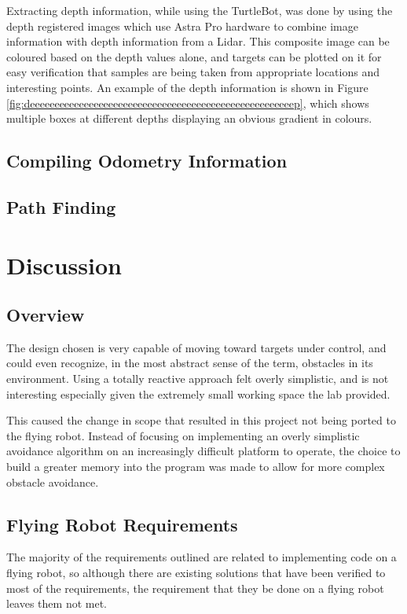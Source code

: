 \documentclass{article}[12]
\begin{document}
Extracting depth information, while using the TurtleBot, was done by using the depth registered images which use Astra Pro hardware to combine image information with depth information from a Lidar. This composite image can be coloured based on the depth values alone, and targets can be plotted on it for easy verification that samples are being taken from appropriate locations and interesting points. An example of the depth information is shown in Figure \ref{fig:deeeeeeeeeeeeeeeeeeeeeeeeeeeeeeeeeeeeeeeeeeeeeeeeeeeeeep}, which shows multiple boxes at different depths displaying an obvious gradient in colours.

\subsection{Compiling Odometry Information}

\subsection{Path Finding}


\section{Discussion}

\subsection{Overview}

	The design chosen is very capable of moving toward targets under control, and could even recognize, in the most abstract sense of the term, obstacles in its environment. Using a totally reactive approach felt overly simplistic, and is not interesting especially given the extremely small working space the lab provided.
	
	This caused the change in scope that resulted in this project not being ported to the flying robot. Instead of focusing on implementing an overly simplistic avoidance algorithm on an increasingly difficult platform to operate, the choice to build a greater memory into the program was made to allow for more complex obstacle avoidance.
	
	
\subsection{Flying Robot Requirements}

The majority of the requirements outlined are related to implementing code on a flying robot, so although there are existing solutions that have been verified to most of the requirements, the requirement that they be done on a flying robot leaves them not met.
\end{document}
